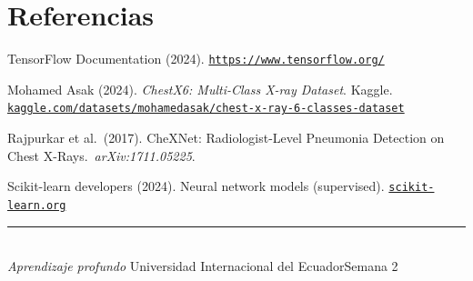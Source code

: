 \documentclass[10pt,twocolumn]{article}
\begin{document}
\section*{Referencias}

\begin{enumerate}[leftmargin=*,noitemsep,topsep=2pt,label={[\arabic*]}]
  \item TensorFlow Documentation (2024).
        \href{https://www.tensorflow.org/}{\texttt{https://www.tensorflow.org/}}
  \item Mohamed Asak (2024). \textit{ChestX6: Multi-Class X-ray Dataset}.
        Kaggle.
        \href{https://www.kaggle.com/datasets/mohamedasak/chest-x-ray-6-classes-dataset}%
        {\texttt{kaggle.com/datasets/mohamedasak/chest-x-ray-6-classes-dataset}}
  \item Rajpurkar et al.\ (2017). CheXNet: Radiologist-Level Pneumonia
        Detection on Chest X-Rays.\ \textit{arXiv:1711.05225}.
  \item Scikit-learn developers (2024). Neural network models (supervised).
        \href{https://scikit-learn.org/stable/modules/neural_networks_supervised.html}%
        {\texttt{scikit-learn.org}}
\end{enumerate}

\vfill
\noindent\rule{\columnwidth}{0.4pt}\\
{\scriptsize\textit{Aprendizaje profundo}\hfill
Universidad Internacional del Ecuador\hfill Semana 2}
\end{document}
